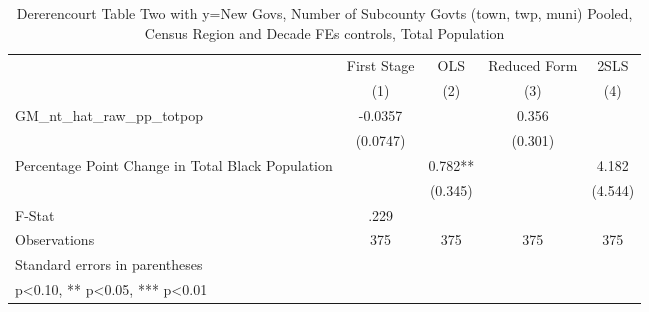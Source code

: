 \begin{table}[htbp]\centering
\def\sym#1{\ifmmode^{#1}\else\(^{#1}\)\fi}
\caption{Dererencourt Table Two with y=New Govs, Number of Subcounty Govts (town, twp, muni)  Pooled, Census Region and Decade FEs controls, Total Population}
\begin{tabular}{l*{4}{c}}
\toprule
                    & First Stage   &         OLS   &Reduced Form   &        2SLS   \\
                    &\multicolumn{1}{c}{(1)}   &\multicolumn{1}{c}{(2)}   &\multicolumn{1}{c}{(3)}   &\multicolumn{1}{c}{(4)}   \\
\midrule
GM\_nt\_hat\_raw\_pp\_totpop&     -0.0357   &               &       0.356   &               \\
                    &    (0.0747)   &               &     (0.301)   &               \\
\addlinespace
Percentage Point Change in Total Black Population&               &       0.782** &               &       4.182   \\
                    &               &     (0.345)   &               &     (4.544)   \\
\midrule
F-Stat              &        .229   &               &               &               \\
Observations        &         375   &         375   &         375   &         375   \\
\bottomrule
\multicolumn{5}{l}{\footnotesize Standard errors in parentheses}\\
\multicolumn{5}{l}{\footnotesize * p<0.10, ** p<0.05, *** p<0.01}\\
\end{tabular}
\end{table}
